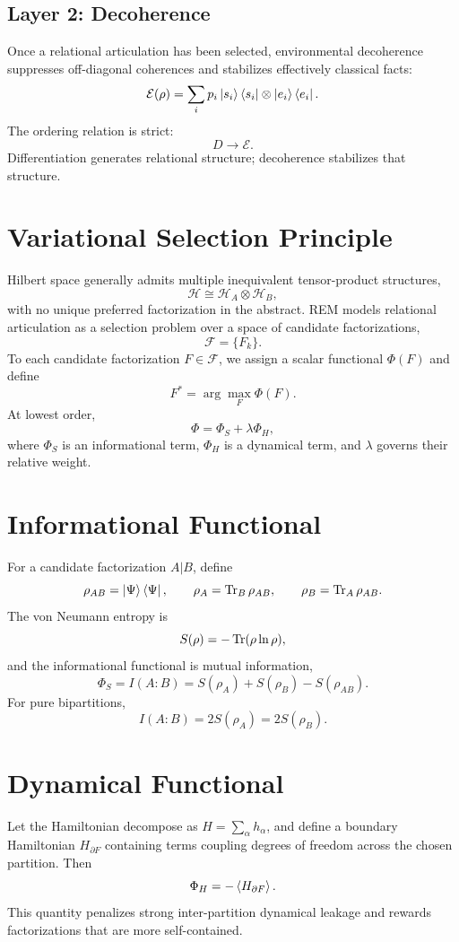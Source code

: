 \documentclass[11pt]{article}
\begin{document}
\subsection{Layer 2: Decoherence}
Once a relational articulation has been selected, environmental decoherence suppresses off-diagonal coherences and stabilizes effectively classical facts:
\[
\mathcal{E}(\rho)=\sum_i p_i \ket{s_i}\bra{s_i}\otimes \ket{e_i}\bra{e_i}.
\]
The ordering relation is strict:
\[
D \rightarrow \mathcal{E}.
\]
Differentiation generates relational structure; decoherence stabilizes that structure.

\section{Variational Selection Principle}
Hilbert space generally admits multiple inequivalent tensor-product structures,
\[
\mathcal{H}\cong \mathcal{H}_A\otimes \mathcal{H}_B,
\]
with no unique preferred factorization in the abstract. REM models relational articulation as a selection problem over a space of candidate factorizations,
\[
\mathcal{F}=\{F_k\}.
\]
To each candidate factorization $F\in\mathcal{F}$, we assign a scalar functional $\Phi(F)$ and define
\[
F^\ast=\arg\max_F \Phi(F).
\]
At lowest order,
\[
\Phi=\Phi_S+\lambda \Phi_H,
\]
where $\Phi_S$ is an informational term, $\Phi_H$ is a dynamical term, and $\lambda$ governs their relative weight.

\section{Informational Functional}
For a candidate factorization $A|B$, define
\[
\rho_{AB}=\ket{\Psi}\bra{\Psi},\qquad \rho_A=\Tr_B \rho_{AB},\qquad \rho_B=\Tr_A \rho_{AB}.
\]
The von Neumann entropy is
\[
S(\rho)=-\Tr(\rho \ln \rho),
\]
and the informational functional is mutual information,
\[
\Phi_S=I(A:B)=S(\rho_A)+S(\rho_B)-S(\rho_{AB}).
\]
For pure bipartitions,
\[
I(A:B)=2S(\rho_A)=2S(\rho_B).
\]

\section{Dynamical Functional}
Let the Hamiltonian decompose as $H=\sum_\alpha h_\alpha$, and define a boundary Hamiltonian $H_{\partial F}$ containing terms coupling degrees of freedom across the chosen partition. Then
\[
\Phi_H=-\ev{H_{\partial F}}.
\]
This quantity penalizes strong inter-partition dynamical leakage and rewards factorizations that are more self-contained.
\end{document}
